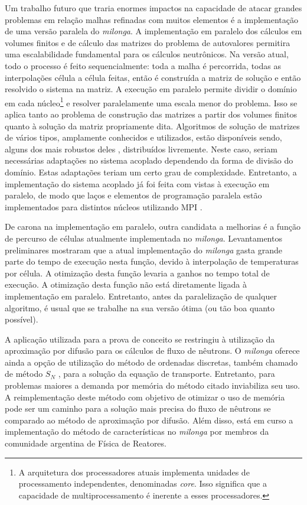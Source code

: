 Um trabalho futuro que traria enormes impactos na capacidade de atacar grandes problemas em relação malhas refinadas
com muitos elementos é a implementação de uma versão paralela do \textit{milonga}. A implementação em paralelo dos
cálculos em volumes finitos e de cálculo das matrizes do problema de autovalores permitira uma escalabilidade
fundamental para os cálculos neutrônicos. Na versão atual, todo o processo é feito sequencialmente: toda a malha
é percorrida, todas as interpolações célula a célula feitas, então é construída a matriz de solução e então resolvido
o sistema na matriz. A execução em paralelo permite dividir o domínio em cada núcleo\footnote{A arquitetura dos processadores
  atuais implementa unidades de processamento independentes, denominadas \textit{core}. Isso significa que a
capacidade de multiprocessamento é inerente a esses processadores.} e resolver paralelamente
uma escala menor do problema. Isso se aplica tanto ao problema de construção das matrizes a partir dos volumes finitos
quanto à solução da matriz propriamente dita. Algoritmos de solução de matrizes de vários tipos, amplamente conhecidos
e utilizados, estão disponíveis sendo, alguns dos mais robustos deles \cite{Hernandez2005, Balay2016}, distribuídos livremente.
Neste caso, seriam necessárias adaptações no sistema acoplado dependendo da forma de divisão do domínio. Estas adaptações teriam
um certo grau de complexidade. Entretanto, a implementação do sistema acoplado já foi feita com vistas à execução em paralelo,
de modo que laços e elementos de programação paralela estão implementados para distintos núcleos utilizando MPI \cite{Quinn2004}.

De carona na implementação em paralelo, outra candidata a melhorias é a função de percurso de células atualmente
implementada no \textit{milonga}. Levantamentos preliminares mostraram que a atual implementação do \textit{milonga}
gasta grande parte do tempo de execução nesta função, devido à interpolação de temperaturas por célula. A otimização
desta função levaria a ganhos no tempo total de execução. A otimização desta função não está diretamente ligada à
implementação em paralelo. Entretanto, antes da paralelização de qualquer algoritmo, é usual que
se trabalhe na sua versão ótima (ou tão boa quanto possível).

A aplicação utilizada para a prova de conceito se restringiu à utilização da aproximação por difusão para os cálculos
de fluxo de nêutrons. O \textit{milonga} oferece ainda a opção de utilização do método de ordenadas discretas,
também chamado de método $S_N$ \cite{Hebert2009}, para a solução da equação de transporte. Entretanto, para problemas
maiores a demanda por memória do método citado inviabiliza seu uso. A reimplementação deste método com objetivo de
otimizar o uso de memória pode ser um caminho para a solução mais precisa do fluxo de nêutrons se comparado ao método
de aproximação por difusão. Além disso, está em curso a implementação do método de características \cite{Hebert2009} no \textit{milonga}
por membros da comunidade argentina de Física de Reatores.

